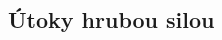 \documentclass[
  printed, %
  table,   %
  lof,     %
  lot,     %
]{fithesis3}
\begin{document}
\subsection{Útoky hrubou silou}
\end{document}
